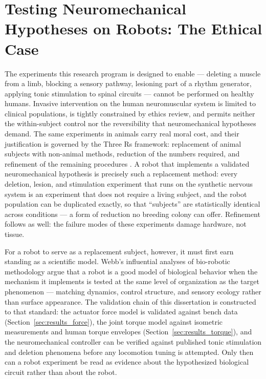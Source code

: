 \section{Testing Neuromechanical Hypotheses on Robots: The Ethical Case}\label{sec:bg_ethics}

The experiments this research program is designed to enable --- deleting a muscle from a limb, blocking a sensory pathway, lesioning part of a rhythm generator, applying tonic stimulation to spinal circuits --- cannot be performed on healthy humans. Invasive intervention on the human neuromuscular system is limited to clinical populations, is tightly constrained by ethics review, and permits neither the within-subject control nor the reversibility that neuromechanical hypotheses demand. The same experiments in animals carry real moral cost, and their justification is governed by the Three Rs framework: replacement of animal subjects with non-animal methods, reduction of the numbers required, and refinement of the remaining procedures \citep{russell_principles_1959, tannenbaum_russell_2015}. A robot that implements a validated neuromechanical hypothesis is precisely such a replacement method: every deletion, lesion, and stimulation experiment that runs on the synthetic nervous system is an experiment that does not require a living subject, and the robot population can be duplicated exactly, so that ``subjects'' are statistically identical across conditions --- a form of reduction no breeding colony can offer. Refinement follows as well: the failure modes of these experiments damage hardware, not tissue.

For a robot to serve as a replacement subject, however, it must first earn standing as a scientific model. Webb's influential analyses of bio-robotic methodology \citep{webb_robots_2001, webb_robots_2002} argue that a robot is a good model of biological behavior when the mechanism it implements is tested at the same level of organization as the target phenomenon --- matching dynamics, control structure, and sensory ecology rather than surface appearance. The validation chain of this dissertation is constructed to that standard: the actuator force model is validated against bench data (Section~\ref{sec:results_force}), the joint torque model against isometric measurements and human torque envelopes (Section~\ref{sec:results_torque}), and the neuromechanical controller can be verified against published tonic stimulation and deletion phenomena \citep{selionov_tonic_2009, rybak_modelling_2006} before any locomotion tuning is attempted. Only then can a robot experiment be read as evidence about the hypothesized biological circuit rather than about the robot.


